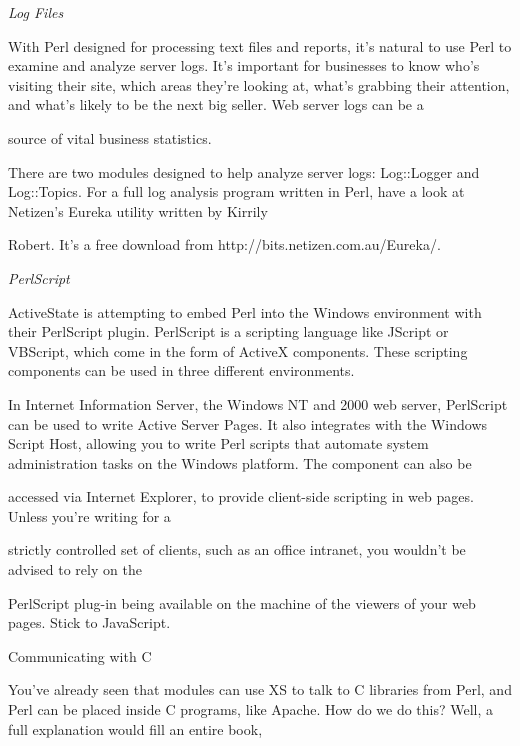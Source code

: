\documentclass[a4paper,11pt]{book}
\begin{document}
\noindent \textit{Log Files}

\noindent With Perl designed for processing text files and reports, it's natural to use Perl to examine and analyze server logs. It's important for businesses to know who's visiting their site, which areas they're looking at, what's grabbing their attention, and what's likely to be the next big seller. Web server logs can be a

\noindent source of vital business statistics.

\noindent 

\noindent There are two modules designed to help analyze server logs: Log::Logger and Log::Topics. For a full log analysis program written in Perl, have a look at Netizen's Eureka utility written by Kirrily

\noindent Robert. It's a free download from http://bits.netizen.com.au/Eureka/.

\noindent 

\noindent \textit{PerlScript}

\noindent ActiveState is attempting to embed Perl into the Windows environment with their PerlScript plugin. PerlScript is a scripting language like JScript or VBScript, which come in the form of ActiveX components. These scripting components can be used in three different environments.

\noindent 

\noindent In Internet Information Server, the Windows NT and 2000 web server, PerlScript can be used to write Active Server Pages. It also integrates with the Windows Script Host, allowing you to write Perl scripts that automate system administration tasks on the Windows platform. The component can also be

\noindent accessed via Internet Explorer, to provide client-side scripting in web pages. Unless you're writing for a

\noindent strictly controlled set of clients, such as an office intranet, you wouldn't be advised to rely on the

\noindent PerlScript plug-in being available on the machine of the viewers of your web pages. Stick to JavaScript.

\noindent 

\noindent 

\noindent Communicating with C

\noindent You've already seen that modules can use XS to talk to C libraries from Perl, and Perl can be placed inside C programs, like Apache. How do we do this? Well, a full explanation would fill an entire book,
\end{document}
